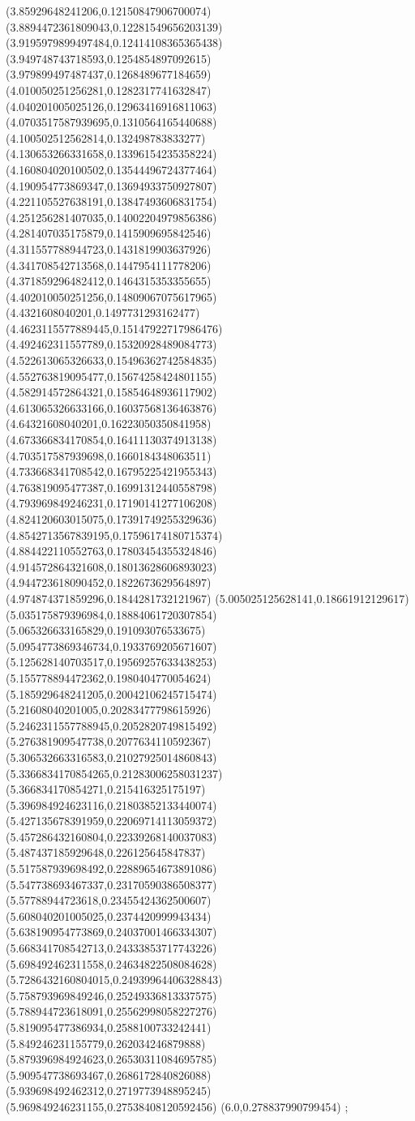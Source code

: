 {(3.85929648241206,0.12150847906700074)
(3.8894472361809043,0.12281549656203139)
(3.9195979899497484,0.12414108365365438)
(3.949748743718593,0.1254854897092615)
(3.979899497487437,0.1268489677184659)
(4.010050251256281,0.1282317741632847)
(4.040201005025126,0.12963416916811063)
(4.0703517587939695,0.1310564165440688)
(4.100502512562814,0.132498783833277)
(4.130653266331658,0.13396154235358224)
(4.160804020100502,0.13544496724377464)
(4.190954773869347,0.13694933750927807)
(4.221105527638191,0.13847493606831754)
(4.251256281407035,0.14002204979856386)
(4.281407035175879,0.1415909695842546)
(4.311557788944723,0.1431819903637926)
(4.341708542713568,0.1447954111778206)
(4.371859296482412,0.1464315353355655)
(4.402010050251256,0.14809067075617965)
(4.4321608040201,0.1497731293162477)
(4.4623115577889445,0.15147922717986476)
(4.492462311557789,0.15320928489084773)
(4.522613065326633,0.15496362742584835)
(4.552763819095477,0.15674258424801155)
(4.582914572864321,0.15854648936117902)
(4.613065326633166,0.16037568136463876)
(4.64321608040201,0.16223050350841958)
(4.673366834170854,0.16411130374913138)
(4.703517587939698,0.1660184348063511)
(4.733668341708542,0.16795225421955343)
(4.763819095477387,0.16991312440558798)
(4.793969849246231,0.17190141277106208)
(4.824120603015075,0.17391749255329636)
(4.8542713567839195,0.17596174180715374)
(4.884422110552763,0.17803454355324846)
(4.914572864321608,0.18013628606893023)
(4.944723618090452,0.1822673629564897)
(4.974874371859296,0.1844281732121967)
(5.005025125628141,0.18661912129617)
(5.035175879396984,0.18884061720307854)
(5.065326633165829,0.191093076533675)
(5.0954773869346734,0.1933769205671607)
(5.125628140703517,0.19569257633438253)
(5.155778894472362,0.1980404770054624)
(5.185929648241205,0.20042106245715474)
(5.21608040201005,0.20283477798615926)
(5.2462311557788945,0.2052820749815492)
(5.276381909547738,0.2077634110592367)
(5.306532663316583,0.21027925014860843)
(5.3366834170854265,0.21283006258031237)
(5.366834170854271,0.215416325175197)
(5.396984924623116,0.21803852133440074)
(5.427135678391959,0.22069714113059372)
(5.457286432160804,0.22339268140037083)
(5.487437185929648,0.226125645847837)
(5.517587939698492,0.22889654673891086)
(5.547738693467337,0.23170590386508377)
(5.57788944723618,0.23455424362500607)
(5.608040201005025,0.2374420999943434)
(5.638190954773869,0.24037001466334307)
(5.668341708542713,0.24333853717743226)
(5.698492462311558,0.24634822508084628)
(5.7286432160804015,0.24939964406328843)
(5.758793969849246,0.25249336813337575)
(5.788944723618091,0.25562998058227276)
(5.819095477386934,0.2588100733242441)
(5.849246231155779,0.262034246879888)
(5.879396984924623,0.26530311084695785)
(5.909547738693467,0.2686172840826088)
(5.939698492462312,0.2719773948895245)
(5.969849246231155,0.27538408120592456)
(6.0,0.278837990799454)
};
